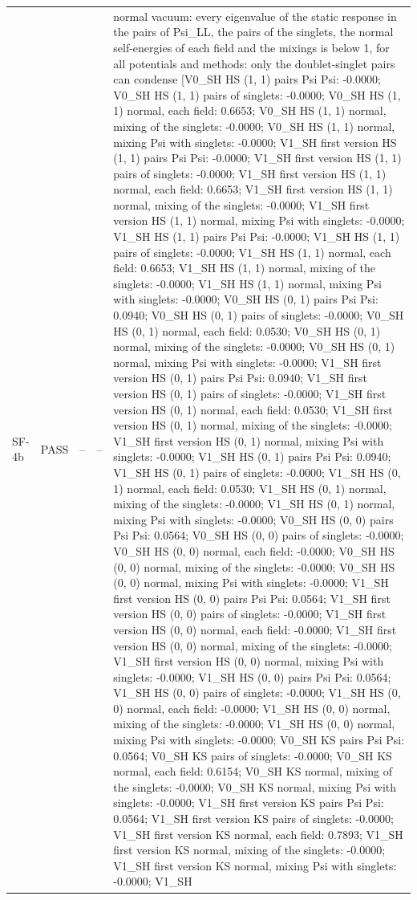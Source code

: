 \documentclass[aps,prd,onecolumn,superscriptaddress,nofootinbib,floatfix,longbibliography]{revtex4-2}
\begin{document}
\begin{longtable}{p{}p{}p{}p{}p{}}
SF-4b & PASS & -- & -- & normal vacuum: every eigenvalue of the static response in the pairs of Psi\_LL, the pairs of the singlets, the normal self-energies of each field and the mixings is below 1, for all potentials and methods: only the doublet-singlet pairs can condense [V0\_SH HS (1, 1) pairs Psi Psi: -0.0000; V0\_SH HS (1, 1) pairs of singlets: -0.0000; V0\_SH HS (1, 1) normal, each field: 0.6653; V0\_SH HS (1, 1) normal, mixing of the singlets: -0.0000; V0\_SH HS (1, 1) normal, mixing Psi with singlets: -0.0000; V1\_SH first version HS (1, 1) pairs Psi Psi: -0.0000; V1\_SH first version HS (1, 1) pairs of singlets: -0.0000; V1\_SH first version HS (1, 1) normal, each field: 0.6653; V1\_SH first version HS (1, 1) normal, mixing of the singlets: -0.0000; V1\_SH first version HS (1, 1) normal, mixing Psi with singlets: -0.0000; V1\_SH HS (1, 1) pairs Psi Psi: -0.0000; V1\_SH HS (1, 1) pairs of singlets: -0.0000; V1\_SH HS (1, 1) normal, each field: 0.6653; V1\_SH HS (1, 1) normal, mixing of the singlets: -0.0000; V1\_SH HS (1, 1) normal, mixing Psi with singlets: -0.0000; V0\_SH HS (0, 1) pairs Psi Psi: 0.0940; V0\_SH HS (0, 1) pairs of singlets: -0.0000; V0\_SH HS (0, 1) normal, each field: 0.0530; V0\_SH HS (0, 1) normal, mixing of the singlets: -0.0000; V0\_SH HS (0, 1) normal, mixing Psi with singlets: -0.0000; V1\_SH first version HS (0, 1) pairs Psi Psi: 0.0940; V1\_SH first version HS (0, 1) pairs of singlets: -0.0000; V1\_SH first version HS (0, 1) normal, each field: 0.0530; V1\_SH first version HS (0, 1) normal, mixing of the singlets: -0.0000; V1\_SH first version HS (0, 1) normal, mixing Psi with singlets: -0.0000; V1\_SH HS (0, 1) pairs Psi Psi: 0.0940; V1\_SH HS (0, 1) pairs of singlets: -0.0000; V1\_SH HS (0, 1) normal, each field: 0.0530; V1\_SH HS (0, 1) normal, mixing of the singlets: -0.0000; V1\_SH HS (0, 1) normal, mixing Psi with singlets: -0.0000; V0\_SH HS (0, 0) pairs Psi Psi: 0.0564; V0\_SH HS (0, 0) pairs of singlets: -0.0000; V0\_SH HS (0, 0) normal, each field: -0.0000; V0\_SH HS (0, 0) normal, mixing of the singlets: -0.0000; V0\_SH HS (0, 0) normal, mixing Psi with singlets: -0.0000; V1\_SH first version HS (0, 0) pairs Psi Psi: 0.0564; V1\_SH first version HS (0, 0) pairs of singlets: -0.0000; V1\_SH first version HS (0, 0) normal, each field: -0.0000; V1\_SH first version HS (0, 0) normal, mixing of the singlets: -0.0000; V1\_SH first version HS (0, 0) normal, mixing Psi with singlets: -0.0000; V1\_SH HS (0, 0) pairs Psi Psi: 0.0564; V1\_SH HS (0, 0) pairs of singlets: -0.0000; V1\_SH HS (0, 0) normal, each field: -0.0000; V1\_SH HS (0, 0) normal, mixing of the singlets: -0.0000; V1\_SH HS (0, 0) normal, mixing Psi with singlets: -0.0000; V0\_SH KS pairs Psi Psi: 0.0564; V0\_SH KS pairs of singlets: -0.0000; V0\_SH KS normal, each field: 0.6154; V0\_SH KS normal, mixing of the singlets: -0.0000; V0\_SH KS normal, mixing Psi with singlets: -0.0000; V1\_SH first version KS pairs Psi Psi: 0.0564; V1\_SH first version KS pairs of singlets: -0.0000; V1\_SH first version KS normal, each field: 0.7893; V1\_SH first version KS normal, mixing of the singlets: -0.0000; V1\_SH first version KS normal, mixing Psi with singlets: -0.0000; V1\_SH 
\end{longtable}
\end{document}
